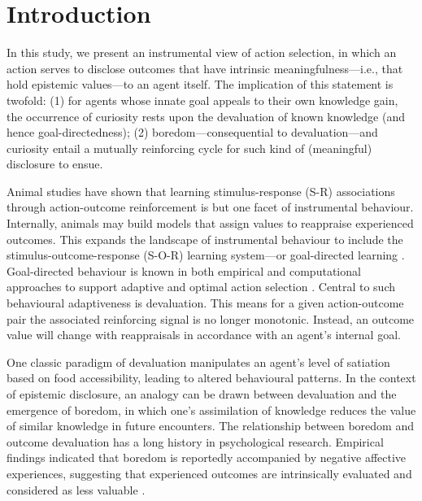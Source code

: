 \documentclass[utf8]{frontiersSCNS}
\begin{document}
\section{Introduction}

In this study, we present an instrumental view of action selection, in which an action serves to disclose outcomes that have intrinsic meaningfulness---i.e., that hold epistemic values---to an agent itself. The implication of this statement is twofold: (1) for agents whose innate goal appeals to their own knowledge gain, the occurrence of curiosity rests upon the devaluation of known knowledge (and hence goal-directedness); (2) boredom---consequential to devaluation---and curiosity entail a mutually reinforcing cycle for such kind of (meaningful) disclosure to ensue.

Animal studies have shown that learning stimulus-response (S-R) associations through action-outcome reinforcement is but one facet of instrumental behaviour. Internally, animals may build models that assign values to reappraise experienced outcomes. This expands the landscape of instrumental behaviour to include the stimulus-outcome-response (S-O-R) learning system---or goal-directed learning \citep{Balleine.1998}. Goal-directed behaviour is known in both empirical and computational approaches to support adaptive and optimal action selection \citep{adams1981instrumental, adams1982variations, mannella2016goal}. Central to such behavioural adaptiveness is devaluation. This means for a given action-outcome pair the associated reinforcing signal is no longer monotonic. Instead, an outcome value will change with reappraisals in accordance with an agent's internal goal. 

One classic paradigm of devaluation manipulates an agent's level of satiation based on food accessibility, leading to altered behavioural patterns. In the context of epistemic disclosure, an analogy can be drawn between devaluation and the emergence of boredom, in which one's assimilation of knowledge reduces the value of similar knowledge in future encounters. The relationship between boredom and outcome devaluation has a long history in psychological research. Empirical findings indicated that boredom is reportedly accompanied by negative affective experiences, suggesting that experienced outcomes are intrinsically evaluated and considered as less valuable \citep{bench2013function, van2012boredom, fahlman2009does, perkins1985cognitive, vodanovich1991boredom}. 
\end{document}

